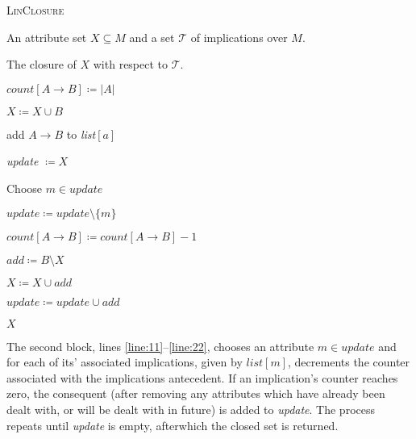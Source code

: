 \begin{algo}
	{\textsc{LinClosure}}

	\label{algorithm:LinClosure}

	\Require An attribute set $X\subseteq M$ and a set $\mathcal{T}$ of implications
	over $M$.

	\Ensure The closure of $X$ with respect to $\mathcal{T}$.

	 \label{line:1}

	\State $\textit{count}[A \rightarrow B] \coloneqq \vert A \vert$


	\State $X \coloneqq X \cup B$

	\EndIf


	\State add $A \rightarrow B$ to \textit{list}$[a]$

	\EndFor

	\EndFor \label{line:8}

	\State \textit{update} $\coloneqq X$

	 \label{line:11}

	\State Choose $m \in \textit{update}$

	\State $\textit{update}\coloneqq \textit{update}\setminus \{m\}$


	\State
	$\textit{count}[A \rightarrow B] \coloneqq \textit{count}[A \rightarrow B] - 1$

	\EndFor


	\State $\textit{add}\coloneqq B \setminus X$

	\State $X \coloneqq X \cup \textit{add}$

	\State $\textit{update}\coloneqq \textit{update}\cup \textit{add}$

	\EndIf

	\EndWhile \label{line:22}

	\State \Return $X$
\end{algo}

The second block, lines \ref{line:11}--\ref{line:22}, chooses an attribute $m \in
	\textit{update}$ and for each of its' associated implications, given by $\textit{
		list}[m]$, decrements the counter associated with the implications antecedent. If
an implication's counter reaches zero, the consequent (after removing any attributes
which have already been dealt with, or will be dealt with in future) is added to
\textit{update}. The process repeats until \textit{update} is empty, afterwhich the
closed set is returned.

